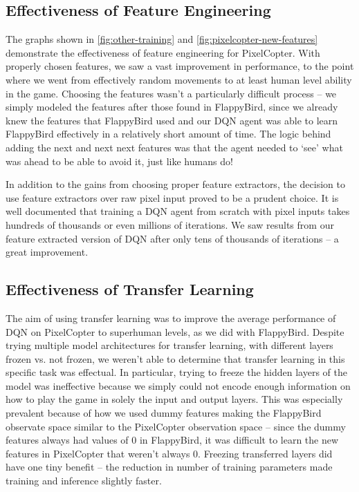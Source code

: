 \documentclass{article}
\begin{document}
\subsection{Effectiveness of Feature Engineering}
The graphs shown in \ref{fig:other-training} and \ref{fig:pixelcopter-new-features} demonstrate the effectiveness of feature engineering for PixelCopter.
With properly chosen features, we saw a vast improvement in performance, to the point where we went from effectively random movements to at least human level ability in the game.
Choosing the features wasn't a particularly difficult process -- we simply modeled the features after those found in FlappyBird, since we already knew the features that FlappyBird used and our DQN agent was able to learn FlappyBird effectively in a relatively short amount of time.
The logic behind adding the next and next next features was that the agent needed to `see' what was ahead to be able to avoid it, just like humans do!

In addition to the gains from choosing proper feature extractors, the decision to use feature extractors over raw pixel input proved to be a prudent choice. 
It is well documented that training a DQN agent from scratch with pixel inputs takes hundreds of thousands or even millions of iterations.
We saw results from our feature extracted version of DQN after only tens of thousands of iterations -- a great improvement.


\subsection{Effectiveness of Transfer Learning}
The aim of using transfer learning was to improve the average performance of DQN on PixelCopter to superhuman levels, as we did with FlappyBird.
Despite trying multiple model architectures for transfer learning, with different layers frozen vs. not frozen, we weren't able to determine that transfer learning in this specific task was effectual.
In particular, trying to freeze the hidden layers of the model was ineffective because we simply could not encode enough information on how to play the game in solely the input and output layers.
This was especially prevalent because of how we used dummy features making the FlappyBird observate space similar to the PixelCopter observation space -- since the dummy features always had values of 0 in FlappyBird, it was difficult to learn the new features in PixelCopter that weren't always 0.
Freezing transferred layers did have one tiny benefit -- the reduction in number of training parameters made training and inference slightly faster.
\end{document}
